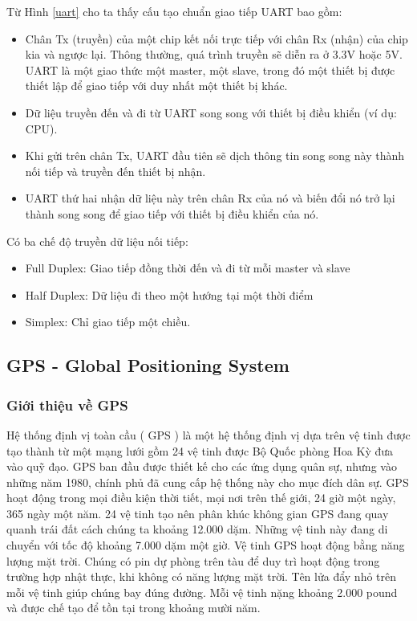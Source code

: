 \documentclass{article} %
\begin{document}
	Từ Hình \ref{uart} cho ta thấy cấu tạo chuẩn giao tiếp UART bao gồm:
	
	\begin{itemize}
		\item Chân Tx (truyền) của một chip kết nối trực tiếp với chân Rx (nhận) của chip kia và ngược lại. Thông thường, quá trình truyền sẽ diễn ra ở 3.3V hoặc 5V. UART là một giao thức một master, một slave, trong đó một thiết bị được thiết lập để giao tiếp với duy nhất một thiết bị khác.
		\item Dữ liệu truyền đến và đi từ UART song song với thiết bị điều khiển (ví dụ: CPU).
		\item Khi gửi trên chân Tx, UART đầu tiên sẽ dịch thông tin song song này thành nối tiếp và truyền đến thiết bị nhận.
		\item UART thứ hai nhận dữ liệu này trên chân Rx của nó và biến đổi nó trở lại thành song song để giao tiếp với thiết bị điều khiển của nó.
	\end{itemize}
	
	
	Có ba chế độ truyền dữ liệu nối tiếp:
	\begin{itemize}
		\item Full Duplex: Giao tiếp đồng thời đến và đi từ mỗi master và slave
		\item Half Duplex: Dữ liệu đi theo một hướng tại một thời điểm
		\item Simplex: Chỉ giao tiếp một chiều.
	\end{itemize}
	
	
	\subsection{GPS - Global Positioning System}
	\subsubsection{Giới thiệu về GPS}
	Hệ thống định vị toàn cầu ( GPS ) là một hệ thống định vị dựa trên vệ tinh được tạo thành từ một mạng lưới gồm 24 vệ tinh được Bộ Quốc phòng Hoa Kỳ đưa vào quỹ đạo. GPS ban đầu được thiết kế cho các ứng dụng quân sự, nhưng vào những năm 1980, chính phủ đã cung cấp hệ thống này cho mục đích dân sự. GPS hoạt động trong mọi điều kiện thời tiết, mọi nơi trên thế giới, 24 giờ một ngày, 365 ngày một năm. 24 vệ tinh tạo nên phân khúc không gian GPS đang quay quanh trái đất cách chúng ta khoảng 12.000 dặm. Những vệ tinh này đang di chuyển với tốc độ khoảng 7.000 dặm một giờ. Vệ tinh GPS hoạt động bằng năng lượng mặt trời. Chúng có pin dự phòng trên tàu để duy trì hoạt động trong trường hợp nhật thực, khi không có năng lượng mặt trời. Tên lửa đẩy nhỏ trên mỗi vệ tinh giúp chúng bay đúng đường. Mỗi vệ tinh nặng khoảng 2.000 pound và được chế tạo để tồn tại trong khoảng mười năm.
	
\end{document}
